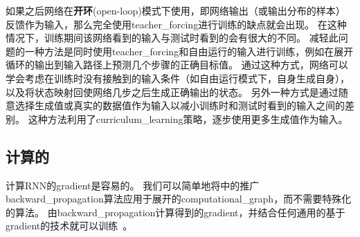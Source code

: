 
如果之后网络在\textbf{开环}(open-loop)模式下使用，即网络输出（或输出分布的样本）反馈作为输入，那么完全使用\gls{teacher_forcing}进行训练的缺点就会出现。
在这种情况下，训练期间该网络看到的输入与测试时看到的会有很大的不同。
减轻此问题的一种方法是同时使用\gls{teacher_forcing}和自由运行的输入进行训练，例如在展开循环的输出到输入路径上预测几个步骤的正确目标值。
通过这种方式，网络可以学会考虑在训练时没有接触到的输入条件（如自由运行模式下，自身生成自身），以及将状态映射回使网络几步之后生成正确输出的状态。
另外一种方式\citep{SamyBengio-et-al-arxiv2015}是通过随意选择生成值或真实的数据值作为输入以减小训练时和测试时看到的输入之间的差别。
这种方法利用了\gls{curriculum_learning}策略，逐步使用更多生成值作为输入。

\subsection{计算的}
\label{sec:computing_the_gradient_in_a_recurrent_neural_network}
计算\gls{RNN}的\gls{gradient}是容易的。
我们可以简单地将中的推广\gls{backward_propagation}算法应用于展开的\gls{computational_graph}，而不需要特殊化的算法。
由\gls{backward_propagation}计算得到的\gls{gradient}，并结合任何通用的基于\gls{gradient}的技术就可以训练~。

